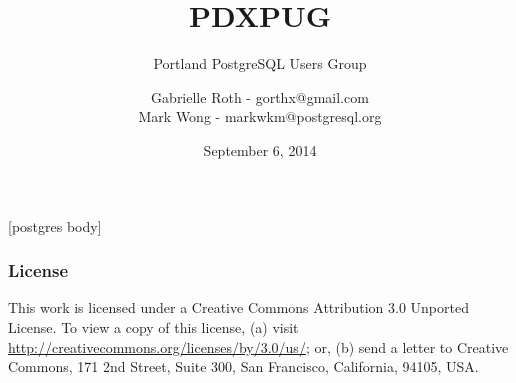 \documentclass{beamer}
\title{PDXPUG}
\subtitle{Portland PostgreSQL Users Group}
\author[gorthx markwkm]{Gabrielle Roth - gorthx@gmail.com\\Mark Wong - markwkm@postgresql.org}
\date{September 6, 2014}
\begin{document}
\frame{\titlepage}

[postgres body]



\frame
{
  \frametitle{License}

  This work is licensed under a Creative Commons Attribution 3.0
  Unported License. To view a copy of this license, (a) visit
  \url{http://creativecommons.org/licenses/by/3.0/us/}; or, (b) send a
  letter to Creative Commons, 171 2nd Street, Suite 300, San Francisco,
  California, 94105, USA.
}
\end{document}
